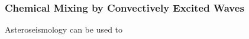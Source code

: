 {\color{purple}
\subsubsection{Chemical Mixing by Convectively Excited Waves}
}

Asteroseismology can be used to


